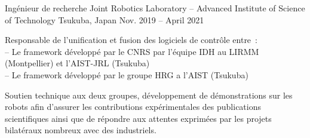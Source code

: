 
\begin{cventries}

  \cventry
    {Ingénieur de recherche} %
    {Joint Robotics Laboratory -- Advanced Institute of Science of Technology} %
    {Tsukuba, Japan} %
    {Nov. 2019 -- April 2021} %
    {
      \begin{cvitems} %
        \item Responsable de l'unification et fusion des logiciels de contrôle entre~:\\
          -- Le framework  développé par le CNRS par l'équipe IDH au LIRMM (Montpellier) et l'AIST-JRL (Tsukuba)\\
          -- Le framework  développé par le groupe HRG a l'AIST (Tsukuba)
        \item Soutien technique aux deux groupes, développement de démonstrations sur les robots afin d'assurer les contributions expérimentales des publications scientifiques ainsi que de répondre aux attentes exprimées par les projets bilatéraux nombreux avec des industriels.
      \end{cvitems}
    }


\end{cventries}
